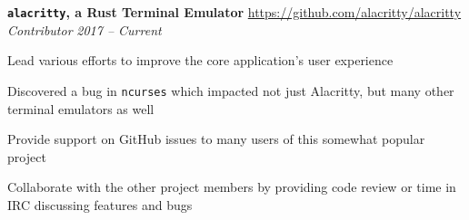 \item
\headerrow
{\textbf{\texttt{alacritty}, a Rust Terminal Emulator}}
{\url{https://github.com/alacritty/alacritty}}
\headerrow
{\emph{Contributor}}
{\emph{2017 -- Current}}
\begin{itemize*}
    \item Lead various efforts to improve the core application's user
        experience
    \item Discovered a bug in \texttt{ncurses} which impacted not just
        Alacritty, but many other terminal emulators as well
    \item Provide support on GitHub issues to many users of this somewhat
        popular project
    \item Collaborate with the other project members by providing code review or
        time in IRC discussing features and bugs
\end{itemize*}

